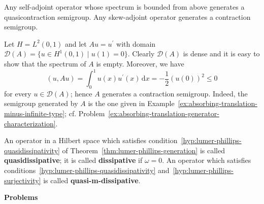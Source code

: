 \begin{Example}
\label{ex:self-skew-adjoint-semigroup-generation}
Any self-adjoint operator whose spectrum is bounded from above generates a quasicontraction semigroup. Any skew-adjoint operator generates a contraction semigroup.
\end{Example}

\begin{Example}
\label{ex:absorbing-translation-dissipative-generator}
Let $H=L^2(0,1)$ and let $Au=u^{\prime}$ with domain $\mathcal{D}(A)=\{u\in H^1(0,1)\mid u(1)=0\}$. Clearly $\mathcal{D}(A)$ is dense and it is easy to show that the spectrum of $A$ is empty. Moreover, we have
\begin{equation}\label{eq:absorbing-translation-generator-dissipation-identity}
(u,Au)=\int_0^1u(x)u^{\prime}(x)\,\mathrm{d}x=-\dfrac{1}{2}(u(0))^2\leq0
\end{equation}
for every $u\in\mathcal{D}(A)$; hence $A$ generates a contraction semigroup. Indeed, the semigroup generated by $A$ is the one given in Example~\ref{ex:absorbing-translation-minus-infinite-type}; cf. Problem~\ref{ex:absorbing-translation-generator-characterization}.
\end{Example}

\begin{Definition}
\label{def:quasidissipative-dissipative-quasi-m}
An operator in a Hilbert space which satisfies condition~\ref{hyp:lumer-phillips-quasidissipativity} of Theorem~\ref{thm:lumer-phillips-generation} is called \textbf{quasidissipative}; it is called \textbf{dissipative} if $\omega=0$. An operator which satisfies conditions~\ref{hyp:lumer-phillips-quasidissipativity} and~\ref{hyp:lumer-phillips-surjectivity} is called \textbf{quasi-m-dissipative}.
\end{Definition}

\textbf{Problems}

